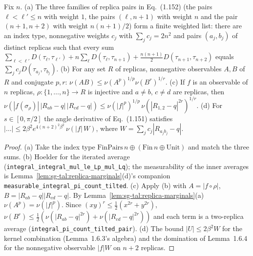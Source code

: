 \begin{lemma}
\label{lem:sg-tal:replica-holder}
  \leanok
{}
Fix $n$.  (a) The three families of replica pairs in Eq.~(1.152) (the pairs $\ell<\ell'\le n$ with weight $1$, the pairs $(\ell,n+1)$ with weight $n$ and the pair $(n+1,n+2)$ with weight $n(n+1)/2$) form a finite weighted list: there are an index type, nonnegative weights $c_j$ with $\sum_jc_j=2n^2$ and pairs $(a_j,b_j)$ of distinct replicas such that every sum $\sum_{\ell<\ell'}D(\tau_\ell,\tau_{\ell'})+n\sum_\ell D(\tau_\ell,\tau_{n+1})+\frac{n(n+1)}2D(\tau_{n+1},\tau_{n+2})$ equals $\sum_jc_jD(\tau_{a_j},\tau_{b_j})$.  (b) For any set $R$ of replicas, nonnegative observables $A,B$ of $R$ and conjugate $p,r$: $\nu(AB)\le\nu(A^p)^{1/p}\nu(B^r)^{1/r}$.  (c) If $f$ is an observable of $n$ replicas, $\rho:\{1,\dots,n\}\to R$ is injective and $a\ne b$, $c\ne d$ are replicas, then $\nu(|f(\sigma_\rho)|\,|R_{ab}-q|\,|R_{cd}-q|)\le\nu(|f|^p)^{1/p}\,\nu(|R_{1,2}-q|^{2r})^{1/r}$.  (d) For $s\in[0,\pi/2]$ the angle derivative of Eq.~(1.151) satisfies $|\ldots|\le2\beta^2e^{4(n+2)^2\beta^2}\,\nu(|f|\,W)$, where $W=\sum_jc_j|R_{a_jb_j}-q|$.
\end{lemma}
\begin{proof}
  \leanok
(a) Take the index type $\mathrm{FinPairs}\,n\oplus(\mathrm{Fin}\,n\oplus\mathrm{Unit})$ and match the three sums.  (b) Hoelder for the iterated average (\texttt{integral\_integral\_mul\_le\_Lp\_mul\_Lq}); the measurability of the inner averages is Lemma~\ref{lem:sg-tal:replica-marginals}(d)'s companion \texttt{measurable\_integral\_pi\_count\_tilted}.  (c) Apply (b) with $A=|f\circ\rho|$, $B=|R_{ab}-q||R_{cd}-q|$.  By Lemma~\ref{lem:sg-tal:replica-marginals}(a) $\nu(A^p)=\nu(|f|^p)$.  Since $(xy)^r\le\frac12(x^{2r}+y^{2r})$, $\nu(B^r)\le\frac12(\nu(|R_{ab}-q|^{2r})+\nu(|R_{cd}-q|^{2r}))$ and each term is a two-replica average (\texttt{integral\_pi\_count\_tilted\_pair}).  (d) The bound $|U|\le2\beta^2W$ for the kernel combination (Lemma~1.6.3's algebra) and the domination of Lemma~1.6.4 for the nonnegative observable $|f|W$ on $n+2$ replicas.
\end{proof}

